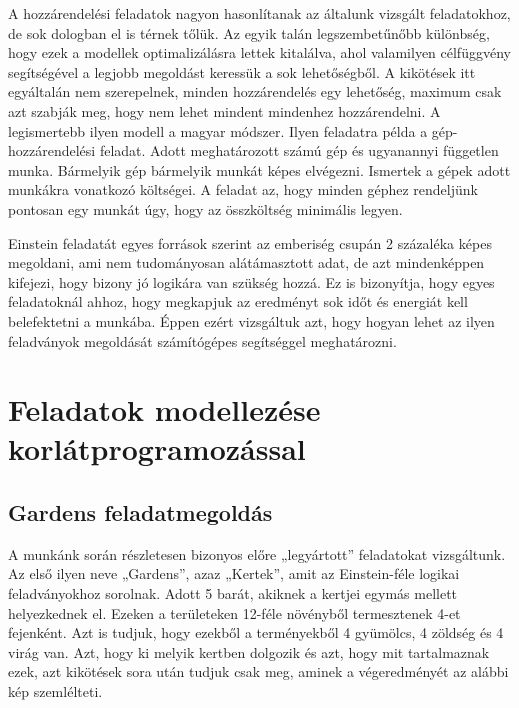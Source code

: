 \documentclass[12pt,a4paper,twoside, openright]{report}
\begin{document}
    A hozzárendelési feladatok nagyon hasonlítanak az általunk vizsgált feladatokhoz, de sok dologban el is térnek tőlük.
    Az egyik talán legszembetűnőbb különbség, hogy ezek a modellek optimalizálásra lettek kitalálva, ahol valamilyen célfüggvény segítségével a legjobb megoldást keressük a sok lehetőségből.
    A kikötések itt egyáltalán nem szerepelnek, minden hozzárendelés egy lehetőség, maximum csak azt szabják meg, hogy nem lehet mindent mindenhez hozzárendelni.
    A legismertebb ilyen modell a magyar módszer\cite{magyarmodszer}.
    Ilyen feladatra példa a gép-hozzárendelési feladat.
    Adott meghatározott számú gép és ugyanannyi független munka.
    Bármelyik gép bármelyik munkát képes elvégezni.
    Ismertek a gépek adott munkákra vonatkozó költségei.
    A feladat az, hogy minden géphez rendeljünk pontosan egy munkát úgy, hogy az összköltség minimális legyen.

    Einstein feladatát egyes források szerint az emberiség csupán 2 százaléka képes megoldani, ami nem tudományosan alátámasztott adat, de azt mindenképpen kifejezi, hogy bizony jó logikára van szükség hozzá.
    Ez is bizonyítja, hogy egyes feladatoknál ahhoz, hogy megkapjuk az eredményt sok időt és energiát kell belefektetni a munkába.
    Éppen ezért vizsgáltuk azt, hogy hogyan lehet az ilyen feladványok megoldását számítógépes segítséggel meghatározni.
		
\chapter{Feladatok modellezése korlátprogramozással}



\section{Gardens feladatmegoldás} 

    A munkánk során részletesen bizonyos előre „legyártott” feladatokat vizsgáltunk.
    Az első ilyen neve „Gardens”, azaz „Kertek”, amit az Einstein-féle logikai feladványokhoz sorolnak\cite{gardens}.
    Adott 5 barát, akiknek a kertjei egymás mellett helyezkednek el.
    Ezeken a területeken 12-féle növényből termesztenek 4-et fejenként.
    Azt is tudjuk, hogy ezekből a terményekből 4 gyümölcs, 4 zöldség és 4 virág van.
    Azt, hogy ki melyik kertben dolgozik és azt, hogy mit tartalmaznak ezek, azt kikötések sora után tudjuk csak meg, aminek a végeredményét az alábbi kép szemlélteti.
\end{document}
